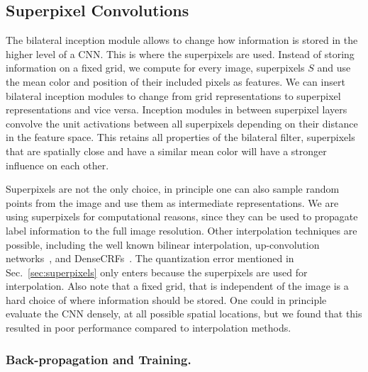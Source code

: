 \subsection{Superpixel Convolutions}
The bilateral inception module allows to change how information is stored in the higher level of a CNN. This is where the superpixels are used.
Instead of storing information on a fixed grid, we compute for every image, superpixels $S$ and use the mean color and position of their included pixels as features.
We can insert bilateral inception modules to change from grid representations to superpixel representations and vice versa.
Inception modules in between superpixel layers convolve the unit activations between all superpixels depending on their distance in the feature space.
This retains all properties of the bilateral filter, superpixels that are spatially close and have a similar mean color will have a stronger influence on each other.

Superpixels are not the only choice, in principle one can also sample random points from the image and use them as intermediate representations.
We are using superpixels for computational reasons, since they can be used to propagate label information to the full image resolution.
Other interpolation techniques are possible, including the well known bilinear interpolation, up-convolution networks~\cite{zeiler2010deconvolutional}, and DenseCRFs~\cite{krahenbuhl2012efficient}.
The quantization error mentioned in Sec.~\ref{sec:superpixels} only enters because the superpixels are used for interpolation.
Also note that a fixed grid, that is independent of the image is a hard choice of where information should be stored.
One could in principle evaluate the CNN densely, at all possible spatial locations,
but we found that this resulted in poor performance compared to interpolation methods.


\subsubsection{Back-propagation and Training.}

